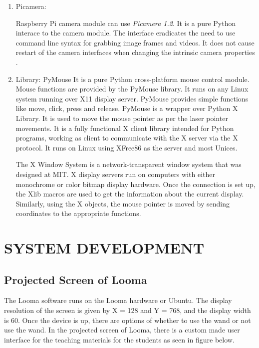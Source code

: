 \documentclass[12pt, a4paper]{article}
\begin{document}
\begin{enumerate}
\item Picamera:

Raspberry Pi camera module can use \emph{Picamera 1.2}. It is a pure Python interace to the camera module. The interface eradicates the need to use command line syntax for grabbing image frames and videos. It does not cause restart of the camera interfaces when changing the intrinsic camera properties
. 
\item Library: PyMouse
It is a pure Python cross-platform mouse control module. Mouse functions are provided by the PyMouse library. It runs on any Linux system running over X11 display server. PyMouse provides simple functions like move, click, press and release. PyMouse is a wrapper over Python X Library. It is used to move the mouse pointer as per the laser pointer movements. It is a fully functional X client library intended for Python programs, working as client to communicate with the X server via the X protocol. It runs on Linux using XFree86 as the server and most Unices.


The X Window System is a network-transparent window system that was designed at MIT. X display servers run on computers with either monochrome or color bitmap display hardware. Once the connection is set up, the Xlib macros are used to get the information about the current display. Similarly, using the X objects, the mouse pointer is moved by sending coordinates to the appropriate functions. 

\end{enumerate}
\newpage
\section{SYSTEM DEVELOPMENT}
\subsection{Projected Screen of Looma}

The Looma software runs on the Looma hardware or Ubuntu. The display resolution of the screen is given by X = 128 and Y = 768, and the display width is 60. Once the device is up, there are options of whether to use the wand or not use the wand. In the projected screen of Looma, there is a custom made user interface for the teaching materials for the students as seen in figure below.
\end{document}
